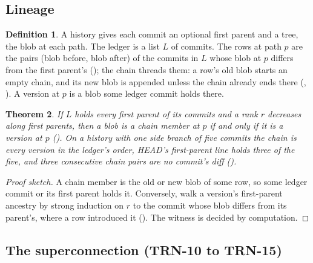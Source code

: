 \documentclass[11pt]{article}
\theoremstyle{plain}
\newtheorem{theorem}{Theorem}[section]
\theoremstyle{definition}
\newtheorem{definition}[theorem]{Definition}
\theoremstyle{remark}
\begin{document}
\subsection{Lineage}

\begin{definition}
A history gives each commit an optional first parent and a tree, the blob at each path. The
ledger is a list $L$ of commits. The rows at path $p$ are the pairs (blob before, blob after) of
the commits in $L$ whose blob at $p$ differs from the first parent's (); the
chain threads them: a row's old blob starts an empty chain, and its new blob is appended unless
the chain already ends there (, ). A version at $p$ is a
blob some ledger commit holds there.
\end{definition}

\begin{theorem}\label{thm:lineage}
If $L$ holds every first parent of its commits and a rank $r$ decreases along first parents, then
a blob is a chain member at $p$ if and only if it is a version at $p$
(). On a history with one side branch of five commits
the chain is every version in the ledger's order, HEAD's first-parent line holds three of the
five, and three consecutive chain pairs are no commit's diff
().
\end{theorem}

\begin{proof}[Proof sketch]
A chain member is the old or new blob of some row, so some ledger commit or its first parent
holds it. Conversely, walk a version's first-parent ancestry by strong induction on $r$ to the
commit whose blob differs from its parent's, where a row introduced it
(). The witness is decided by computation.
\end{proof}

\subsection{The superconnection (TRN-10 to TRN-15)}
\end{document}
